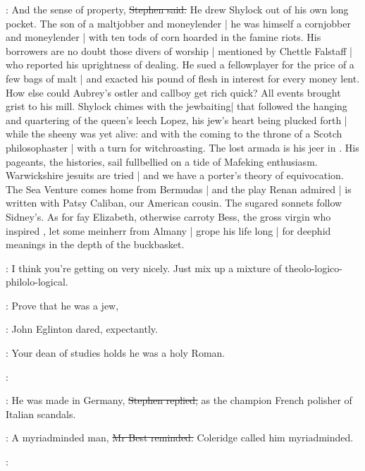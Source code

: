 \Stephen:
And the sense of property,
\sout{Stephen said.}
He drew Shylock out of his own long pocket.
The son of a maltjobber and moneylender |
he was himself a cornjobber and moneylender |
with ten tods of corn hoarded in the famine riots.
His borrowers are no doubt those divers of worship |
mentioned by Chettle Falstaff |
who reported his uprightness of dealing.
He sued a fellowplayer for the price of a few bags of malt |
and exacted his pound of flesh in interest for every money lent.
How else could Aubrey's ostler and callboy get rich quick?
All events brought grist to his mill.
Shylock chimes with the jewbaiting|
that followed the hanging and quartering of the queen's leech Lopez,
his jew's heart being plucked forth |
while the sheeny was yet alive:
 and 
with the coming to the throne of a Scotch philosophaster |
with a turn for witchroasting.
The lost armada is his jeer in .
His pageants, the histories,
sail fullbellied on a tide of Mafeking enthusiasm.
Warwickshire jesuits are tried |
and we have a porter's theory of equivocation.
The Sea Venture comes home from Bermudas |
and the play Renan admired |
is written with Patsy Caliban,
our American cousin.
The sugared sonnets follow Sidney's.
As for fay Elizabeth,
otherwise carroty Bess,
the gross virgin who inspired ,
let some meinherr from Almany |
grope his life long |
for deephid meanings
in the depth of the buckbasket.

\StephenInt:
I think you're getting on very nicely.
Just mix up a mixture of theolo-logico-philolo-logical.




\eglinton:
Prove that he was a jew,

:
John Eglinton dared, expectantly.

\eglinton:
Your dean of studies holds he was a holy Roman.

\StephenInt:

\Stephen:
He was made in Germany,
\sout{Stephen replied,}
as the champion French polisher of Italian scandals.

\best:
A myriadminded man,
\sout{Mr Best reminded.}
Coleridge called him myriadminded.

\StephenInt:

